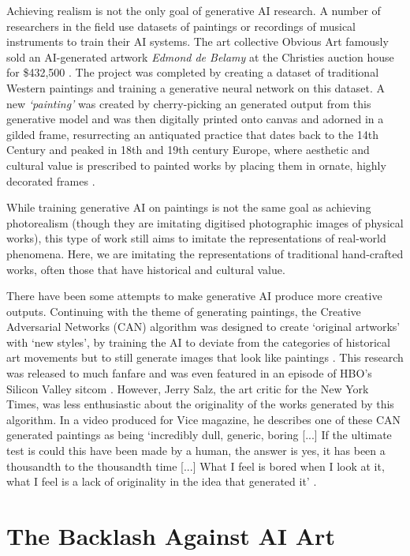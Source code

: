 Achieving realism is not the only goal of generative AI research. 
A number of researchers in the field use datasets of paintings or recordings of musical instruments to train their AI systems. 
The art collective Obvious Art famously sold an AI-generated artwork \textit{Edmond de Belamy} at the Christies auction house for \$432,500 \citep{christies2018edmond}.
The project was completed by creating a dataset of traditional Western paintings and training a generative neural network on this dataset. 
A new \textit{`painting’} was created by cherry-picking an generated output from this generative model and was then digitally printed onto canvas and adorned in a gilded frame, resurrecting an antiquated practice that dates back to the 14th Century and peaked in 18th and 19th century Europe, where aesthetic and cultural value is prescribed to painted works by placing them in ornate, highly decorated frames \citep{kiilerich2001savedoff}.

While training generative AI on paintings is not the same goal as achieving photorealism (though they are imitating digitised photographic images of physical works), this type of work still aims to imitate the representations of real-world phenomena. Here, we are imitating the representations of traditional hand-crafted works, often those that have historical and cultural value.

There have been some attempts to make generative AI produce more creative outputs. 
Continuing with the theme of generating paintings, the Creative Adversarial Networks (CAN) algorithm was designed to create ‘original artworks’ with ‘new styles’, by training the AI to deviate from the categories of historical art movements but to still generate images that look like paintings \cite{elgammal2017can}. 
This research was released to much fanfare and was even featured in an episode of HBO’s Silicon Valley sitcom \citep{elhoseiny2019hbo}. 
However, Jerry Salz, the art critic for the New York Times, was less enthusiastic about the originality of the works generated by this algorithm. 
In a video produced for Vice magazine, he describes one of these CAN generated paintings as being `incredibly dull, generic, boring [...] If the ultimate test is could this have been made by a human, the answer is yes, it has been a thousandth to the thousandth time [...] What I feel is bored when I look at it, what I feel is a lack of originality in the idea that generated it' \citep{saltz2018aiart}. 

\section{The Backlash Against AI Art}

